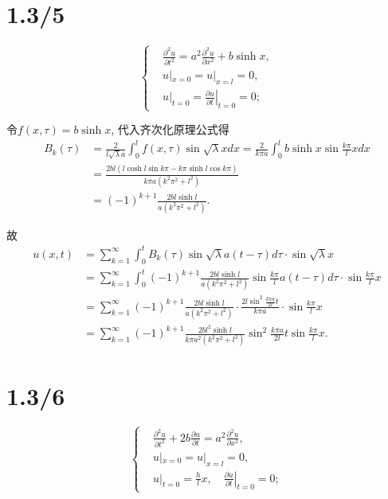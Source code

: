 \documentclass[11pt,a4paper]{article}
\begin{document}
\section{1.3/5}

$$
  \left\{\begin{aligned}
     & \frac{\partial^2u}{\partial t^2}=
    a^2\frac{\partial^2u}{\partial x^2}+b\sinh x,                   \\
     & u|_{x=0}=u|_{x=l}=0,                                         \\
     & u|_{t=0}=\left.\frac{\partial u}{\partial t}\right|_{t=0}=0;
  \end{aligned}\right.
$$

令$f(x,\tau)=b\sinh x$, 代入齐次化原理公式得
\begin{align*}
  B_k(\tau)
   & =\frac{2}{l\sqrt{\lambda}a}\int_0^lf(x,\tau)\sin\sqrt{\lambda}xdx
  =\frac{2}{k\pi a}\int_0^lb\sinh x\sin\frac{k\pi}{l}xdx                         \\
   & =\frac{2bl(l\cosh l\sin k\pi-k\pi\sinh l\cos k\pi)}{k\pi a(k^2\pi^2+l^2)} \\
   & =(-1)^{k+1}\frac{2bl\sinh l}{a(k^2\pi^2+l^2)}.
\end{align*}

故
\begin{align*}
  u(x,t) & =\sum_{k=1}^\infty\int_0^t B_k(\tau)\sin\sqrt{\lambda}a(t-\tau)d\tau\cdot\sin\sqrt{\lambda}x                                          \\
         & =\sum_{k=1}^\infty\int_0^t (-1)^{k+1}\frac{2bl\sinh l}{a(k^2\pi^2+l^2)}\sin\frac{k\pi}{l}a(t-\tau)d\tau\cdot\sin\frac{k\pi}{l}x       \\
         & =\sum_{k=1}^\infty (-1)^{k+1}\frac{2bl\sinh l}{a(k^2\pi^2+l^2)}\cdot\frac{2l\sin^2\frac{k\pi a}{2l}t}{k\pi a}\cdot\sin\frac{k\pi}{l}x \\
         & =\sum_{k=1}^\infty (-1)^{k+1}\frac{2bl^2\sinh l}{k\pi a^2(k^2\pi^2+l^2)}\sin^2\frac{k\pi a}{2l}t\sin\frac{k\pi}{l}x.
\end{align*}

\section{1.3/6}

$$
  \left\{\begin{aligned}
     & \frac{\partial^2u}{\partial t^2}+2b\frac{\partial u}{\partial t}=
    a^2\frac{\partial^2u}{\partial x^2},                                 \\
     & u|_{x=0}=u|_{x=l}=0,                                              \\
     & u|_{t=0}=\frac{h}{l}x,
    \quad \left.\frac{\partial u}{\partial t}\right|_{t=0}=0;
  \end{aligned}\right.
$$
\end{document}

